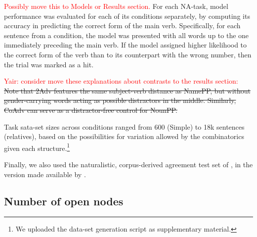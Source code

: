 \textcolor{red}{Possibly move this to Models or Results section.} For
each NA-task, model performance was evaluated for each of its
conditions separately, by computing its accuracy in predicting the
correct form of the main verb. Specifically, for each sentence from a
condition, the model was presented with all words up to the one
immediately preceding the main verb. If the model assigned higher
likelihood to the correct form of the verb than to its counterpart
with the wrong number, then the trial was marked as a hit.

\textcolor{red}{Yair: consider move these explanations about contrasts to the results section:} \sout{Note that 2Adv features the same subject-verb
distance as NamePP, but without gender-carrying words acting as
possible distractors in the middle. Similarly, CoAdv can serve as a
distractor-free control for NounPP.}

Task sata-set sizes across conditions ranged from 600 (Simple) to 18k sentences (relatives),
based on the possibilities for variation allowed by the combinatorics
given each structure.\footnote{We uploaded the data-set generation
  script as supplementary material.}

Finally, we also used the naturalistic, corpus-derived agreement test set of , in the version made available by .

\subsection{Number of open nodes}\label{ssec:n_opennodes}




